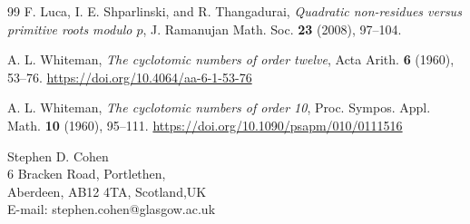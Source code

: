 \documentclass[12pt]{amsart}
\numberwithin{equation}{section}
\begin{document}
\begin{thebibliography}{99}
F. Luca, I. E. Shparlinski, and R. Thangadurai, \emph{Quadratic non-residues versus primitive roots modulo $p$}, J. Ramanujan Math. Soc. \textbf{23} (2008), 97--104.

A. L. Whiteman, \emph{The cyclotomic numbers of order twelve}, Acta Arith. \textbf{6} (1960), 53--76. \url{https://doi.org/10.4064/aa-6-1-53-76}

A. L. Whiteman, \emph{The cyclotomic numbers of order 10}, Proc. Sympos. Appl. Math. \textbf{10} (1960), 95--111. \url{https://doi.org/10.1090/psapm/010/0111516}

\end{thebibliography}

\bigskip
\noindent
Stephen D. Cohen\\
6 Bracken Road, Portlethen, \\
Aberdeen, AB12 4TA, Scotland,UK\\
E-mail: stephen.cohen@glasgow.ac.uk
\end{document}
